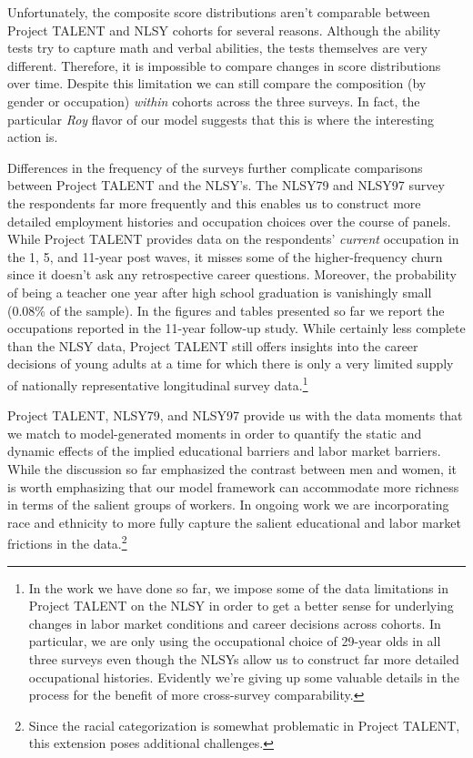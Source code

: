 \documentclass[onehalfspacing,11pt]{article}
\begin{document}
	Unfortunately, the composite score distributions aren't comparable between Project TALENT and NLSY cohorts for several reasons. Although the ability tests try to capture math and verbal abilities, the tests themselves are very different. Therefore, it is impossible to compare changes in score distributions over time. Despite this limitation we can still compare the composition (by gender or occupation) {\it within} cohorts across the three surveys. In fact, the particular {\it Roy} flavor of our model suggests that this is where the interesting action is.
	
	Differences in the frequency of the surveys further complicate comparisons between Project TALENT and the NLSY's. The NLSY79 and NLSY97 survey the respondents far more frequently and this enables us to construct more detailed employment histories and occupation choices over the course of panels. While Project TALENT provides data on the respondents' {\it current} occupation in the 1, 5, and 11-year post waves, it misses some of the higher-frequency churn since it doesn't ask any retrospective career questions. Moreover, the probability of being a teacher one year after high school graduation is vanishingly small (0.08\% of the sample). In the figures and tables presented so far we report the occupations reported in the 11-year follow-up study. While certainly less complete than the NLSY data, Project TALENT still offers insights into the career decisions of young adults at a time for which there is only a very limited supply of nationally representative longitudinal survey data.\footnote{In the work we have done so far, we impose some of the data limitations in Project TALENT on the NLSY in order to get a better sense for underlying changes in labor market conditions and career decisions across cohorts. In particular, we are only using the occupational choice of 29-year olds in all three surveys even though the NLSYs allow us to construct far more detailed occupational histories. Evidently we're giving up some valuable details in the process for the benefit of more cross-survey comparability.}
	
	Project TALENT, NLSY79, and NLSY97 provide us with the data moments that we match to model-generated moments in order to quantify the static and dynamic effects of the implied educational barriers and labor market barriers. While the discussion so far emphasized the contrast between men and women, it is worth emphasizing that our model framework can accommodate more richness in terms of the salient groups of workers. In ongoing work we are incorporating race and ethnicity to more fully capture the salient educational and labor market frictions in the data.\footnote{Since the racial categorization is somewhat problematic in Project TALENT, this extension poses additional challenges.}
	
\end{document}
